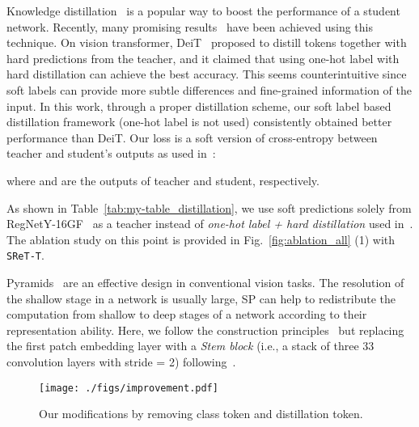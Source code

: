 \documentclass[runningheads]{llncs}
\begin{document}
	 Knowledge distillation~\cite{hinton2015distilling} is a popular way to boost the performance of a student network. Recently, many promising results~\cite{pham2020meta,shen2020meal,xie2020self} have been achieved using this technique. On vision transformer, DeiT~\cite{touvron2020training} proposed to distill tokens together with hard predictions from the teacher, and it claimed that using one-hot label with hard distillation can achieve the best accuracy. This seems counterintuitive since soft labels can provide more subtle differences and fine-grained information of the input. In this work, through a proper distillation scheme, our soft label based distillation framework (one-hot label is not used) consistently obtained better performance than DeiT. 
	Our loss is a soft version of cross-entropy between teacher and student's outputs as used in~\cite{romero2014fitnets,bagherinezhad2018label,shen2021is}:
	
	where  and  are the outputs of teacher and student, respectively. 
	
	
	 As shown in Table~\ref{tab:my-table_distillation}, we use soft predictions solely from RegNetY-16GF~\cite{radosavovic2020designing} as a teacher instead of {\em one-hot label + hard distillation} used in~\cite{touvron2020training}. The ablation study on this point is provided in Fig.~\ref{fig:ablation_all} (1) with \texttt{SReT-T}.
	
	 Pyramids~\cite{1641019,he2015spatial} are an effective design in conventional vision tasks. The resolution of the shallow stage in a network is usually large, SP can help to redistribute the computation from shallow to deep stages of a network according to their representation ability. Here, we follow the construction principles~\cite{heo2021rethinking} but replacing the first patch embedding layer with a {\em Stem block} (i.e., a stack of three 33 convolution layers with stride = 2) following~\cite{shen2017dsod}. 
	
	\begin{wrapfigure}{r}{5.3cm}
	\vspace{-0.32in}
	\texttt{[image: ./figs/improvement.pdf]}
	\vspace{-0.1in}
	\caption{Our modifications by removing class token and distillation token.}
	\label{fig:minor_modification}
	\vspace{-0.3in}
	\end{wrapfigure}
	
\end{document}
